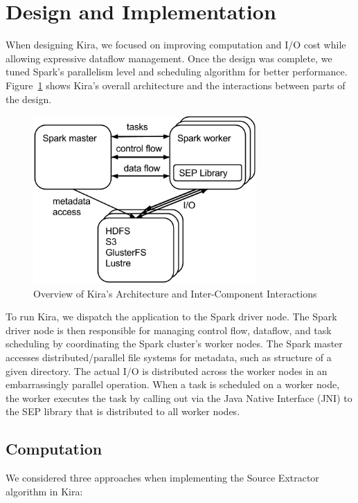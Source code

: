\documentclass[10pt, conference, compsocconf]{IEEEtran}
\begin{document}
\section{Design and Implementation}
\label{sec:Design}

When designing Kira, we focused on improving computation and I/O cost while allowing expressive dataflow management.
Once the design was complete, we tuned Spark's parallelism level and scheduling algorithm for better performance.
Figure~\ref{fig:architecture} shows Kira's overall architecture and the interactions between parts of the design.

\begin{figure}[t]
	\begin{center}
		\includegraphics[width=85mm]{pictures/Kira-Architecture}
		\caption{Overview of Kira's Architecture and Inter-Component Interactions}
		\label{fig:architecture}
  	\end{center}
\end{figure}

To run Kira, we dispatch the application to the Spark driver node. The Spark driver node is then
responsible for managing control flow, dataflow, and task scheduling by coordinating the Spark
cluster's worker nodes. The Spark master accesses distributed/parallel file systems for metadata,
such as structure of a given directory. The actual I/O is distributed across the worker nodes in
an embarrassingly parallel operation. When a task is scheduled on a worker node, the worker executes
the task by calling out via the Java Native Interface (JNI) to the SEP library that is distributed to all worker nodes.

\subsection{Computation}

We considered three approaches when implementing the Source Extractor algorithm in Kira:
\end{document}
